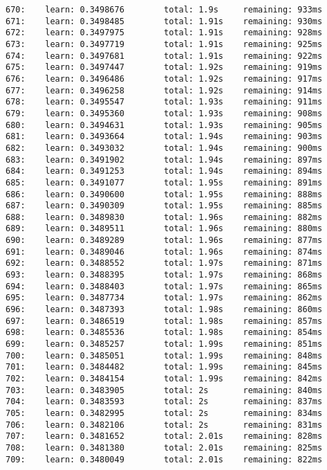 \documentclass[11pt]{article}
\begin{document}
\begin{Verbatim}[commandchars=\\\{\}]
670:    learn: 0.3498676        total: 1.9s     remaining: 933ms
671:    learn: 0.3498485        total: 1.91s    remaining: 930ms
672:    learn: 0.3497975        total: 1.91s    remaining: 928ms
673:    learn: 0.3497719        total: 1.91s    remaining: 925ms
674:    learn: 0.3497681        total: 1.91s    remaining: 922ms
675:    learn: 0.3497447        total: 1.92s    remaining: 919ms
676:    learn: 0.3496486        total: 1.92s    remaining: 917ms
677:    learn: 0.3496258        total: 1.92s    remaining: 914ms
678:    learn: 0.3495547        total: 1.93s    remaining: 911ms
679:    learn: 0.3495360        total: 1.93s    remaining: 908ms
680:    learn: 0.3494631        total: 1.93s    remaining: 905ms
681:    learn: 0.3493664        total: 1.94s    remaining: 903ms
682:    learn: 0.3493032        total: 1.94s    remaining: 900ms
683:    learn: 0.3491902        total: 1.94s    remaining: 897ms
684:    learn: 0.3491253        total: 1.94s    remaining: 894ms
685:    learn: 0.3491077        total: 1.95s    remaining: 891ms
686:    learn: 0.3490600        total: 1.95s    remaining: 888ms
687:    learn: 0.3490309        total: 1.95s    remaining: 885ms
688:    learn: 0.3489830        total: 1.96s    remaining: 882ms
689:    learn: 0.3489511        total: 1.96s    remaining: 880ms
690:    learn: 0.3489289        total: 1.96s    remaining: 877ms
691:    learn: 0.3489046        total: 1.96s    remaining: 874ms
692:    learn: 0.3488552        total: 1.97s    remaining: 871ms
693:    learn: 0.3488395        total: 1.97s    remaining: 868ms
694:    learn: 0.3488403        total: 1.97s    remaining: 865ms
695:    learn: 0.3487734        total: 1.97s    remaining: 862ms
696:    learn: 0.3487393        total: 1.98s    remaining: 860ms
697:    learn: 0.3486519        total: 1.98s    remaining: 857ms
698:    learn: 0.3485536        total: 1.98s    remaining: 854ms
699:    learn: 0.3485257        total: 1.99s    remaining: 851ms
700:    learn: 0.3485051        total: 1.99s    remaining: 848ms
701:    learn: 0.3484482        total: 1.99s    remaining: 845ms
702:    learn: 0.3484154        total: 1.99s    remaining: 842ms
703:    learn: 0.3483905        total: 2s       remaining: 840ms
704:    learn: 0.3483593        total: 2s       remaining: 837ms
705:    learn: 0.3482995        total: 2s       remaining: 834ms
706:    learn: 0.3482106        total: 2s       remaining: 831ms
707:    learn: 0.3481652        total: 2.01s    remaining: 828ms
708:    learn: 0.3481380        total: 2.01s    remaining: 825ms
709:    learn: 0.3480049        total: 2.01s    remaining: 822ms

\end{Verbatim}
\end{document}
